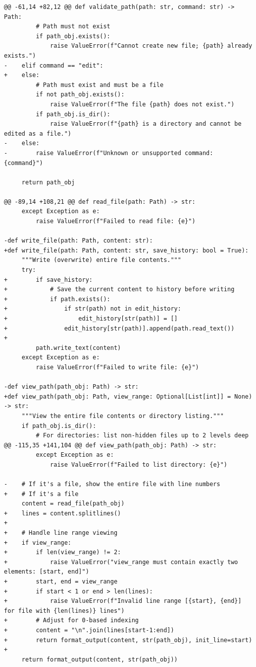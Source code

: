 \documentclass{article}
\begin{document}
\begin{lstlisting}[style=diffstyle]
@@ -61,14 +82,12 @@ def validate_path(path: str, command: str) -> Path:
         # Path must not exist
         if path_obj.exists():
             raise ValueError(f"Cannot create new file; {path} already exists.")
-    elif command == "edit":
+    else:
         # Path must exist and must be a file
         if not path_obj.exists():
             raise ValueError(f"The file {path} does not exist.")
         if path_obj.is_dir():
             raise ValueError(f"{path} is a directory and cannot be edited as a file.")
-    else:
-        raise ValueError(f"Unknown or unsupported command: {command}")
 
     return path_obj
 
@@ -89,14 +108,21 @@ def read_file(path: Path) -> str:
     except Exception as e:
         raise ValueError(f"Failed to read file: {e}")
 
-def write_file(path: Path, content: str):
+def write_file(path: Path, content: str, save_history: bool = True):
     """Write (overwrite) entire file contents."""
     try:
+        if save_history:
+            # Save the current content to history before writing
+            if path.exists():
+                if str(path) not in edit_history:
+                    edit_history[str(path)] = []
+                edit_history[str(path)].append(path.read_text())
+
         path.write_text(content)
     except Exception as e:
         raise ValueError(f"Failed to write file: {e}")
 
-def view_path(path_obj: Path) -> str:
+def view_path(path_obj: Path, view_range: Optional[List[int]] = None) -> str:
     """View the entire file contents or directory listing."""
     if path_obj.is_dir():
         # For directories: list non-hidden files up to 2 levels deep
@@ -115,35 +141,104 @@ def view_path(path_obj: Path) -> str:
         except Exception as e:
             raise ValueError(f"Failed to list directory: {e}")
 
-    # If it's a file, show the entire file with line numbers
+    # If it's a file
     content = read_file(path_obj)
+    lines = content.splitlines()
+
+    # Handle line range viewing
+    if view_range:
+        if len(view_range) != 2:
+            raise ValueError("view_range must contain exactly two elements: [start, end]")
+        start, end = view_range
+        if start < 1 or end > len(lines):
+            raise ValueError(f"Invalid line range [{start}, {end}] for file with {len(lines)} lines")
+        # Adjust for 0-based indexing
+        content = "\n".join(lines[start-1:end])
+        return format_output(content, str(path_obj), init_line=start)
+
     return format_output(content, str(path_obj))
 

\end{lstlisting}
\end{document}
